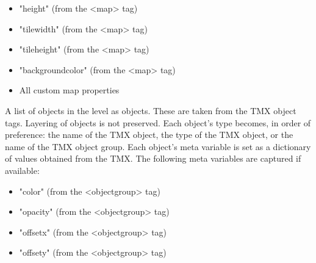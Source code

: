 \documentclass[letterpaper,10pt,english]{sphinxmanual}
\begin{document}
\begin{fulllineitems}
\begin{fulllineitems}
\begin{itemize}
\item {} 
"height" (from the \textless{}map\textgreater{} tag)

\item {} 
"tilewidth" (from the \textless{}map\textgreater{} tag)

\item {} 
"tileheight" (from the \textless{}map\textgreater{} tag)

\item {} 
"backgroundcolor" (from the \textless{}map\textgreater{} tag)

\item {} 
All custom map properties

\end{itemize}

\end{fulllineitems}


\begin{fulllineitems}
\label{\detokenize{index:ulvl.TMX.objects}}
A list of objects in the level as {\hyperref[\detokenize{index:ulvl.LevelObject}]{}}
objects.  These are taken from the TMX object tags. Layering of
objects is not preserved.  Each {\hyperref[\detokenize{index:ulvl.LevelObject}]{}} object's
type becomes, in order of preference: the name of the TMX object,
the type of the TMX object, or the name of the TMX object group.
Each {\hyperref[\detokenize{index:ulvl.LevelObject}]{}} object's meta variable is set as a
dictionary of values obtained from the TMX.  The following meta
variables are captured if available:
\begin{itemize}
\item {} 
"color" (from the \textless{}objectgroup\textgreater{} tag)

\item {} 
"opacity" (from the \textless{}objectgroup\textgreater{} tag)

\item {} 
"offsetx" (from the \textless{}objectgroup\textgreater{} tag)

\item {} 
"offsety" (from the \textless{}objectgroup\textgreater{} tag)


\end{itemize}
\end{fulllineitems}
\end{fulllineitems}
\end{document}
